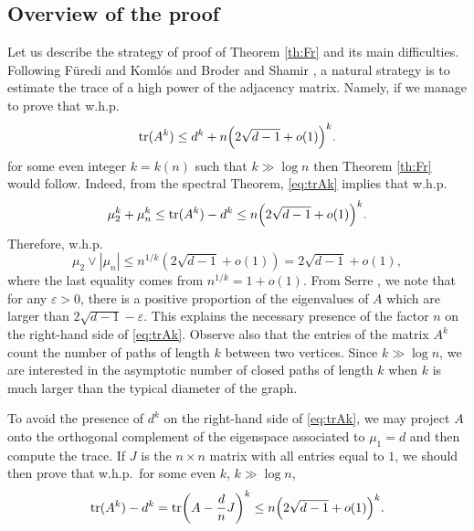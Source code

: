 \documentclass[11pt]{article}
\newcommand{\tr}{{\rm tr}}
\newcommand{\PAR}[1]{{{\left(#1\right)}}} %
\newcommand{\1}{1\!\!{\sf I}}\newcommand{\IND}{\1}
\newcommand{\veps}{\varepsilon}
\newcommand{\whp}{{w.h.p.~}}
\begin{document}
\subsection{Overview of the proof}
\label{subsec:ovpf}


Let us describe the strategy of proof of Theorem \ref{th:Fr} and its main difficulties.  Following F{\"u}redi and Koml{\'o}s  \cite{MR637828} and Broder and Shamir \cite{BrSh}, a natural strategy is to estimate the trace of a high power of the adjacency matrix. Namely, if we manage to prove that \whp 
\begin{equation}\label{eq:trAk}
\tr  ( A^k )  \leq  d^k +  n \PAR{ 2 \sqrt{d-1} + o(1) }^k. 
\end{equation}
for some even integer $k = k(n)$ such that $k \gg \log n $ then Theorem \ref{th:Fr} would follow. Indeed, from the spectral Theorem, \eqref{eq:trAk} implies that \whp 
$$
\mu_2^k + \mu_n ^k \leq \tr (A^k )  -d^k \leq n   \PAR{ 2 \sqrt{d-1} + o(1) }^k.
$$ 
Therefore, \whp
$$
 \mu_2 \vee |\mu_n| \leq n^{1/k} \PAR{ 2 \sqrt{d-1} + o(1) } = 2 \sqrt{d-1} + o(1),
$$
where the last equality comes from $n^{1/k} = 1 + o(1)$. From Serre \cite{MR1396897},  we note that for any $\veps > 0$, there is a positive proportion of the eigenvalues of $A$ which are larger than $2 \sqrt{d-1} - \veps$. This explains the necessary presence of the factor $n$ on the right-hand side of \eqref{eq:trAk}. Observe also that the entries of the matrix $A^k$ count the number of paths of length $k$ between two vertices. Since $k \gg \log n$, we are interested in the asymptotic number of closed paths of length $k$ when $k$ is much larger than the typical diameter of the graph. 

To avoid the presence of $d^k$ on the right-hand side of \eqref{eq:trAk}, we may project $A$ onto the orthogonal complement of the eigenspace associated to $\mu_1 =d$ and then compute the trace. If  $J$ is the $n\times n$ matrix with all entries equal to $1$, we should then prove that \whp for some even $k$, $k \gg \log n$, 
\begin{equation}\label{eq:trAk2}
\tr (A^k) - d^k  = \tr \PAR{ A - \frac{d}{n} J  } ^k \leq   n \PAR{ 2 \sqrt{d-1} + o(1) }^k.
\end{equation}
\end{document}
